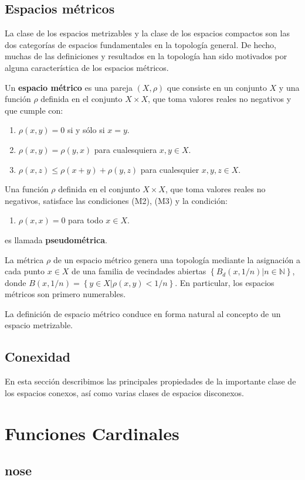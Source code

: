 \documentclass[12pt]{report}
\theoremstyle{largebreak}
\renewcommand{\theenumi}{\arabic{enumi})}
\begin{document}
    \section{Espacios métricos}

    La clase de los espacios metrizables y la clase de los espacios compactos son las dos categorías de espacios fundamentales en la topología general. De hecho, muchas de las definiciones y resultados en la topología han sido motivados por alguna característica de los espacios métricos.

    \begin{mydef}
        Un \textbf{espacio métrico} es una pareja $(X,\rho)$ que consiste en un conjunto $X$ y una función $\rho$ definida en el conjunto $X\times X$, que toma valores reales no negativos y que cumple con:
        \renewcommand{\theenumi}{M\arabic{enumi})}
        \begin{enumerate}
            \item $\rho(x,y)=0$ si y sólo si $x=y$.
            \item $\rho(x,y)=\rho(y,x)$ para cualesquiera $x,y\in X$.
            \item $\rho(x,z)\leq\rho(x+y)+\rho(y,z)$ para cualesquier $x,y,z\in X$.
        \end{enumerate}
        Una función $\rho$ definida en el conjunto $X\times X$, que toma valores reales no negativos, satisface las condiciones (M2), (M3) y la condición:
        \renewcommand{\theenumi}{M\arabic{enumi}')}
        \begin{enumerate}
            \item $\rho(x,x)=0$ para todo $x\in X$.
        \end{enumerate}
        es llamada \textbf{pseudométrica}.
    \end{mydef}

    \renewcommand{\theenumi}{\arabic{enumi})}

    La métrica $\rho$ de un espacio métrico genera una topología mediante la asignación a cada punto $x\in X$ de una familia de vecindades abiertas $\left\{B_d(x,1/n)\big| n\in\mathbb{N} \right\}$, donde $B(x,1/n)=\left\{y\in X\big| \rho(x,y)<1/n \right\}$. En particular, los espacios métricos son primero numerables.

    La definición de espacio métrico conduce en forma natural al concepto de un espacio metrizable.

    \section{Conexidad}
    
    En esta sección describimos las principales propiedades de la importante clase de los espacios conexos, así como varias clases de espacios disconexos.


    \chapter{Funciones Cardinales}

    \section{nose}
\end{document}

